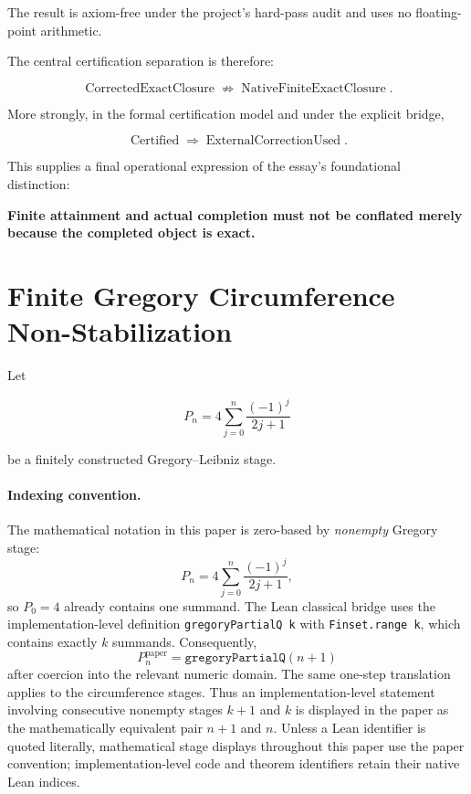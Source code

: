 \documentclass[11pt,a4paper]{article}
\begin{document}
The result is axiom-free under the project's hard-pass audit and uses no
floating-point arithmetic.

The central certification separation is therefore:

\[
\operatorname{CorrectedExactClosure}
\not\Rightarrow
\operatorname{NativeFiniteExactClosure}.
\]

More strongly, in the formal certification model and under the explicit
bridge,

\[
\operatorname{Certified}
\Longrightarrow
\operatorname{ExternalCorrectionUsed}.
\]

This supplies a final operational expression of the essay's foundational
distinction:

\begin{center}
\textbf{Finite attainment and actual completion must not be conflated merely because the completed object is exact.}
\end{center}




\section{Finite Gregory Circumference Non-Stabilization}

Let

\[
P_n
=
4\sum_{j=0}^{n}
\frac{(-1)^j}{2j+1}
\]

be a finitely constructed Gregory--Leibniz stage.

\paragraph{Indexing convention.}
The mathematical notation in this paper is zero-based by
\emph{nonempty} Gregory stage:
\[
P_n
=
4\sum_{j=0}^{n}
\frac{(-1)^j}{2j+1},
\]
so \(P_0=4\) already contains one summand.  The Lean classical bridge
uses the implementation-level definition
\texttt{gregoryPartialQ k} with \texttt{Finset.range k}, which contains
exactly \(k\) summands.  Consequently,
\[
\boxed{
P_n^{\mathrm{paper}}
=
\texttt{gregoryPartialQ}(n+1)
}
\]
after coercion into the relevant numeric domain.  The same one-step
translation applies to the circumference stages.  Thus an
implementation-level statement involving consecutive nonempty stages
\(k+1\) and \(k\) is displayed in the paper as the mathematically
equivalent pair \(n+1\) and \(n\).  Unless a Lean identifier is quoted literally, mathematical
stage displays throughout this paper use the paper convention;
implementation-level code and theorem identifiers retain their native
Lean indices.
\end{document}
